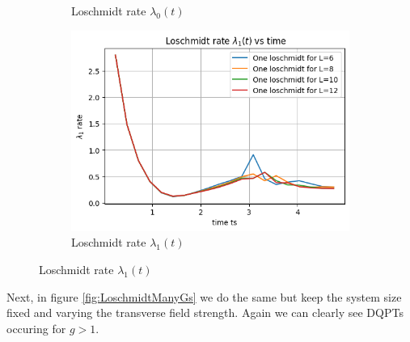 \begin{figure}[h]
\begin{subfigure}[t]{0.48\textwidth}
         \caption{Loschmidt rate $\lambda_0(t)$}
    \end{subfigure}
    \begin{subfigure}[t]{0.48\textwidth}
        \includegraphics[width=\textwidth]{tex/figures/Loschmidt1.png}
         \caption{Loschmidt rate $\lambda_1(t)$}
    \end{subfigure}
\end{figure}

Next, in figure \ref{fig:LoschmidtManyGs} we do the same but keep the system size fixed and varying the transverse field strength. Again we can clearly see DQPTs occuring for $g>1$.

